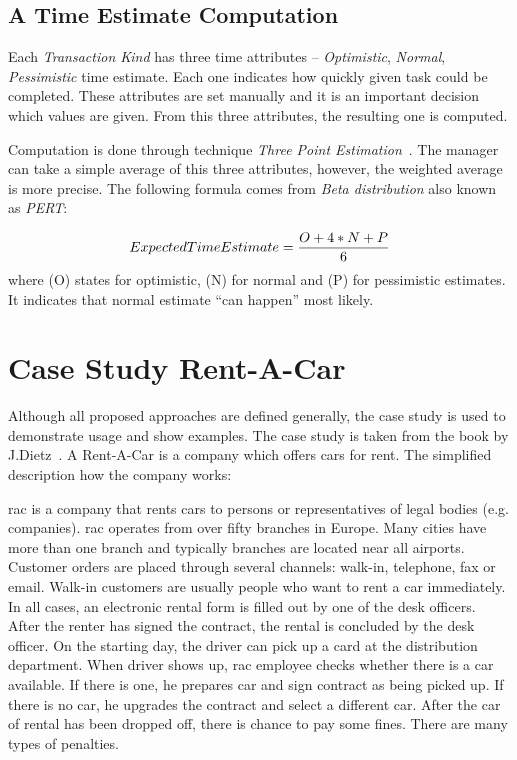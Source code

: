 \subsection{A Time Estimate Computation}
Each \textit{Transaction Kind} has three time attributes -- \textit{Optimistic}, \textit{Normal}, \textit{Pessimistic} time estimate. Each one indicates how quickly given task could be completed. These attributes are set manually and it is an important decision which values are given. From this three attributes, the resulting one is computed.  

Computation is done through technique \textit{Three Point Estimation}~\cite{beta-distribution}. 
The manager can take a simple average of this three attributes, however, the weighted average is more precise.
The following formula comes from \textit{Beta distribution} also known as \textit{PERT}:

\begin{displaymath}
\centering
ExpectedTimeEstimate = \frac{O + 4*N + P}{6}
\end{displaymath}
where (O) states for optimistic, (N) for normal and (P) for pessimistic estimates. It indicates that normal estimate ``can happen'' most likely.
\section{Case Study Rent-A-Car}
Although all proposed approaches are defined generally, the case study is used to demonstrate usage and show examples. The case study is taken from the book by J.Dietz~\cite{dietz-essence-2015}. A Rent-A-Car is a company which offers cars for rent. The simplified description how the company works:

\gls{rac} is a company that rents cars to persons or representatives of legal bodies (e.g. companies). \gls{rac} operates from over fifty branches in Europe. Many cities have more than one branch and typically branches are located near all airports. 
Customer orders are placed through several channels: walk-in, telephone, fax or email. Walk-in customers are usually people who want to rent a car immediately. In all cases, an electronic rental form is filled out by one of the desk officers. 
After the renter has signed the contract, the rental is concluded by the desk officer. On the starting day, the driver can pick up a card at the distribution department. When driver shows up, \gls{rac} employee checks whether there is a car available. If there is one, he prepares car and sign contract as being picked up. If there is no car, he upgrades the contract and select a different car. 
After the car of rental has been dropped off, there is chance to pay some fines. There are many types of penalties.

